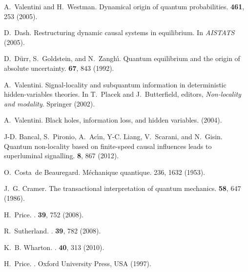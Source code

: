 \documentclass[12pt,onecolumn,nofootinbib]{revtex4-2}
\begin{document}
\begin{thebibliography}{10}
A.~Valentini and H.~Westman.
\newblock Dynamical origin of quantum probabilities.
 \textbf{461}, 253 
  (2005).
  
D.~Dash.
\newblock Restructuring dynamic causal systems in equilibrium.
\newblock In {\em AISTATS} (2005).
  
D.~D{\"u}rr, S.~Goldstein, and N.~Zangh{\'\i}.
\newblock Quantum equilibrium and the origin of absolute uncertainty.
 \textbf{67}, 843 (1992).  
 
A.~Valentini.
\newblock Signal-locality and subquantum information in deterministic
  hidden-variables theories.
\newblock In T.~Placek and J.~Butterfield, editors, {\em Non-locality and
  modality}. Springer (2002).

A.~Valentini.
\newblock Black holes, information loss, and hidden variables.
 (2004).  
  
J-D. Bancal, S.~Pironio, A.~Ac{\'{\i}}n, Y-C. Liang, V.~Scarani, and N.~Gisin.
\newblock Quantum non-locality based on finite-speed causal influences leads to
  superluminal signalling.
 \textbf{8}, 867 (2012).
  
O.~Costa~de Beauregard.
\newblock M{\'e}chanique quantique.
 236, 1632 (1953).

J.~G. Cramer.
\newblock The transactional interpretation of quantum mechanics.
 \textbf{58}, 647 (1986).

H.~Price.
.
  \textbf{39}, 752 (2008).

R.~Sutherland.
.
  \textbf{39}, 782 (2008).

K.~B. Wharton.
.
 \textbf{40}, 313 (2010).

H.~Price.
.
\newblock Oxford University Press, USA (1997).


\end{thebibliography}
\end{document}

